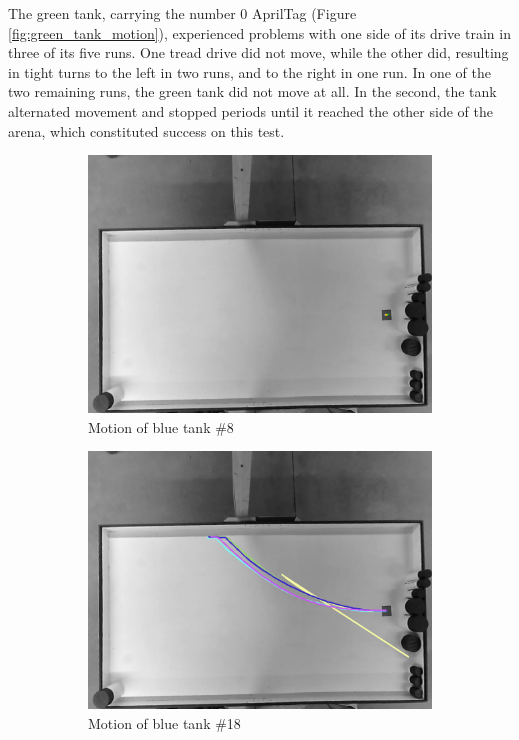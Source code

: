 The green tank, carrying the number 0 AprilTag (Figure \ref{fig:green_tank_motion}), experienced problems with one side of its drive train in three of its five runs.
One tread drive did not move, while the other did, resulting in tight turns to the left in two runs, and to the right in one run. In one of the two remaining runs, the green tank did not move at all. In the second, the tank alternated movement and stopped periods until it reached the other side of the arena, which constituted success on this test. 

\begin{figure}[h]
	\begin{subfigure}[t]{0.47\textwidth}
		\includegraphics[width=\textwidth]{../hardwareX_paper/robot_8.png}
		\caption{Motion of blue tank \#8\label{fig:tank_motion_8}}
	\end{subfigure}
	\begin{subfigure}[t]{0.47\textwidth}
		\includegraphics[width=\textwidth]{../hardwareX_paper/robot_18.png}
		\caption{Motion of blue tank \#18\label{fig:tank_motion_18}}
	\end{subfigure}
	\caption{} %
\end{figure}

